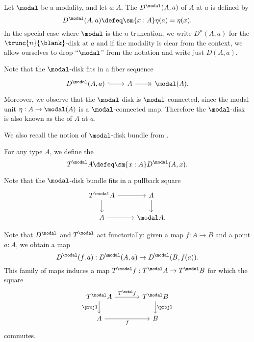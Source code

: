 \documentclass{msc}
\begin{document}
\begin{defn}
  Let $\modal$ be a modality, and let $a:A$. The  $D^{\modal}(A,a)$ of $A$ at $a$ is defined by
  \begin{equation*}
    D^\modal(A,a)\defeq \sm{x:A}\eta(a)=\eta(x).
  \end{equation*}
  In the special case where $\modal$ is the $n$-truncation, we write $D^n(A,a)$ for the $\trunc{n}{\blank}$-disk at $a$ and if the modality is clear from the context, we allow ourselves to drop ``$\modal$'' from the notation and write just $D(A,a)$.
\end{defn}

Note that the $\modal$-disk fits in a fiber sequence
\begin{equation*}
  \begin{tikzcd}
    D^\modal(A,a) \arrow[r,hook] & A \arrow[r,->>] & \modal(A).
  \end{tikzcd}
\end{equation*}
Moreover, we observe that the $\modal$-disk is $\modal$-connected, since the modal unit $\eta:A\to\modal(A)$ is a $\modal$-connected map. Therefore the $\modal$-disk is also known as the  of $A$ at $a$.

We also recall the notion of $\modal$-disk bundle from \cite{wellen-thesis}.

\begin{defn}
  For any type $A$, we define the 
  \begin{equation*}
    T^\modal A \defeq \sm{x:A}D^\modal(A,x).
  \end{equation*}
\end{defn}

Note that the $\modal$-disk bundle fits in a pullback square
\begin{equation*}
  \begin{tikzcd}
    T^\modal A \arrow[r] \arrow[d] & A \arrow[d] \\
    A \arrow[r] & \modal A.
  \end{tikzcd}
\end{equation*}

Note that $D^\modal$ and $T^\modal$ act functorially: given a map $f:A\to B$ and a point $a:A$, we obtain a map
\begin{equation*}
  D^\modal(f,a) : D^\modal(A,a)\to D^\modal(B,f(a)).
\end{equation*}
This family of maps induces a map $T^\modal f:T^\modal A \to T^\modal B$ for which the square
\begin{equation*}
  \begin{tikzcd}[column sep=large]
    T^\modal A \arrow[r,"T^\modal f"] \arrow[d,swap,"\proj 1"] & T^\modal B \arrow[d,"\proj 1"] \\
    A \arrow[r,swap,"f"] & B
  \end{tikzcd}
\end{equation*}
commutes.
\end{document}
